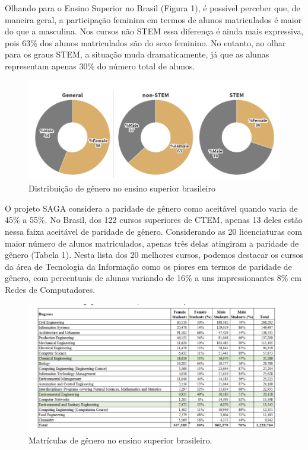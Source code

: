 Olhando para o Ensino Superior no Brasil (Figura 1), é possível perceber que, de maneira geral, a participação feminina em termos de alunos matriculados é maior do que a masculina. Nos cursos não STEM essa diferença é ainda mais expressiva, pois 63\% dos alunos matriculados são do sexo feminino. No entanto, ao olhar para os graus STEM, a situação muda dramaticamente, já que as alunas representam apenas 30\% do número total de alunos.

\begin{figure}
    \centering
    \includegraphics[width=.9\textwidth]{chaps/Images/genderpizza.png}
    \caption{Distribuição de gênero no ensino superior brasileiro}
    \label{fig:genderpizza}
\end{figure}

O projeto SAGA considera a paridade de gênero como aceitável quando varia de 45\% a 55\%. No Brasil, dos 122 cursos superiores de CTEM, apenas 13 deles estão nessa faixa aceitável de paridade de gênero. Considerando as 20 licenciaturas com maior número de alunos matriculados, apenas três delas atingiram a paridade de gênero (Tabela 1). Nesta lista dos 20 melhores cursos, podemos destacar os cursos da área de Tecnologia da Informação como os piores em termos de paridade de gênero, com percentuais de alunas variando de 16\% a uns impressionantes 8\% em Redes de Computadores.

\begin{figure}
    \centering
    \includegraphics[width=.9\textwidth]{chaps/Images/gendertable.png}
    \caption{Matrículas de gênero no ensino superior brasileiro.}
    \label{fig:gendertable}
\end{figure}


